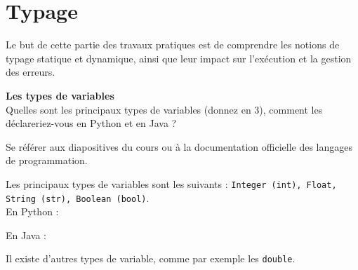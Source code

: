 \newpage

\section{Typage}

Le but de cette partie des travaux pratiques est de comprendre les notions de typage statique et dynamique, ainsi que leur impact sur l’exécution et la gestion des erreurs. \\

\begin{Exercice}[5 minutes]  \textbf{Les types de variables}\\
    
    Quelles sont les principaux types de variables (donnez en 3), comment les déclareriez-vous en Python et en Java ? \\

    \begin{conseil}
    
        Se référer aux diapositives du cours ou à la documentation officielle des langages de programmation.
        
    \end{conseil}
    \begin{solution}
    
        Les principaux types de variables sont les suivants : \lstinline{Integer (int), Float, String (str), Boolean (bool)}.\\

		En Python :    
        
    	 
    	
    	
    	En Java : 
    	
    	 
    	
    	Il existe d'autres types de variable, comme par exemple les \lstinline{double}.
 
    \end{solution}
\end{Exercice}


